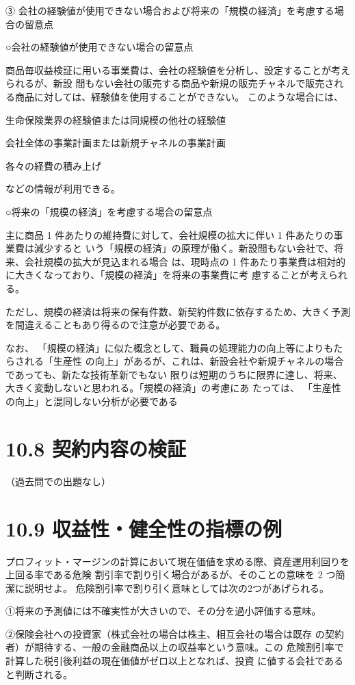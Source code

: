 \documentclass[report,gutter=10mm,fore-edge=10mm,uplatex,dvipdfmx]{jlreq}
\begin{document}
③ 会社の経験値が使用できない場合および将来の「規模の経済」を考慮する場合の留意点

○会社の経験値が使用できない場合の留意点

商品毎収益検証に用いる事業費は、会社の経験値を分析し、設定することが考えられるが、新設
間もない会社の販売する商品や新規の販売チャネルで販売される商品に対しては、経験値を使用することができない。
このような場合には、

生命保険業界の経験値または同規模の他社の経験値

会社全体の事業計画または新規チャネルの事業計画

各々の経費の積み上げ

などの情報が利用できる。

○将来の「規模の経済」を考慮する場合の留意点

主に商品 1 件あたりの維持費に対して、会社規模の拡大に伴い 1 件あたりの事業費は減少すると
いう「規模の経済」の原理が働く。新設間もない会社で、将来、会社規模の拡大が見込まれる場合
は、現時点の 1 件あたり事業費は相対的に大きくなっており、「規模の経済」を将来の事業費に考
慮することが考えられる。

ただし、規模の経済は将来の保有件数、新契約件数に依存するため、大きく予測を間違えることもあり得るので注意が必要である。

なお、
「規模の経済」に似た概念として、職員の処理能力の向上等によりもたらされる「生産性
の向上」があるが、これは、新設会社や新規チャネルの場合であっても、新たな技術革新でもない
限りは短期のうちに限界に達し、将来、大きく変動しないと思われる。「規模の経済」の考慮にあ
たっては、
「生産性の向上」と混同しない分析が必要である

\section{10.8 契約内容の検証}
（過去問での出題なし）
\section{10.9 収益性・健全性の指標の例}

プロフィット・マージンの計算において現在価値を求める際、資産運用利回りを上回る率である危険
割引率で割り引く場合があるが、そのことの意味を 2 つ簡潔に説明せよ。
\answer{}
危険割引率で割り引く意味としては次の2つがあげられる。

①将来の予測値には不確実性が大きいので、その分を過小評価する意味。

②保険会社への投資家（株式会社の場合は株主、相互会社の場合は既存
の契約者）が期待する、一般の金融商品以上の収益率という意味。この
危険割引率で計算した税引後利益の現在価値がゼロ以上となれば、投資
に値する会社であると判断される。
\end{document}
